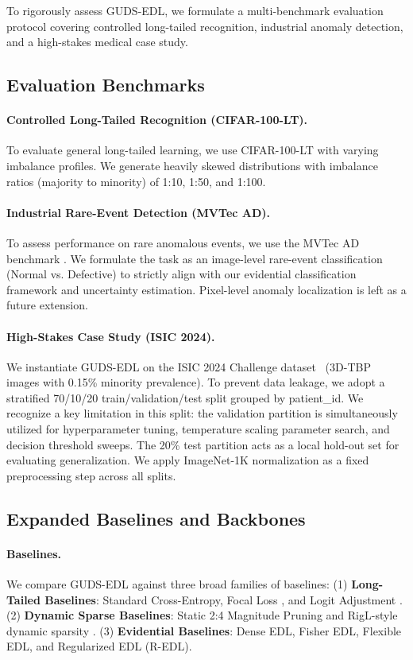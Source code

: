 \documentclass[letterpaper]{article} %
\begin{document}
To rigorously assess GUDS-EDL, we formulate a multi-benchmark evaluation protocol covering controlled long-tailed recognition, industrial anomaly detection, and a high-stakes medical case study.

\subsection{Evaluation Benchmarks}
\paragraph{Controlled Long-Tailed Recognition (CIFAR-100-LT).} To evaluate general long-tailed learning, we use CIFAR-100-LT with varying imbalance profiles. We generate heavily skewed distributions with imbalance ratios (majority to minority) of 1:10, 1:50, and 1:100.

\paragraph{Industrial Rare-Event Detection (MVTec AD).} To assess performance on rare anomalous events, we use the MVTec AD benchmark \cite{bergmann2019mvtec}. We formulate the task as an image-level rare-event classification (Normal vs. Defective) to strictly align with our evidential classification framework and uncertainty estimation. Pixel-level anomaly localization is left as a future extension.

\paragraph{High-Stakes Case Study (ISIC 2024).} We instantiate GUDS-EDL on the ISIC 2024 Challenge dataset~\cite{isic2024} (3D-TBP images with 0.15\% minority prevalence). To prevent data leakage, we adopt a stratified 70/10/20 train/validation/test split grouped by patient\_id. We recognize a key limitation in this split: the validation partition is simultaneously utilized for hyperparameter tuning, temperature scaling parameter search, and decision threshold sweeps. The 20\% test partition acts as a local hold-out set for evaluating generalization. We apply ImageNet-1K normalization as a fixed preprocessing step across all splits.

\subsection{Expanded Baselines and Backbones}
\paragraph{Baselines.} We compare GUDS-EDL against three broad families of baselines: 
(1) \textbf{Long-Tailed Baselines}: Standard Cross-Entropy, Focal Loss \cite{lin2017focal}, and Logit Adjustment \cite{menon2021long}.
(2) \textbf{Dynamic Sparse Baselines}: Static 2:4 Magnitude Pruning and RigL-style dynamic sparsity \cite{evci2020rigging}.
(3) \textbf{Evidential Baselines}: Dense EDL, Fisher EDL, Flexible EDL, and Regularized EDL (R-EDL).
\end{document}
